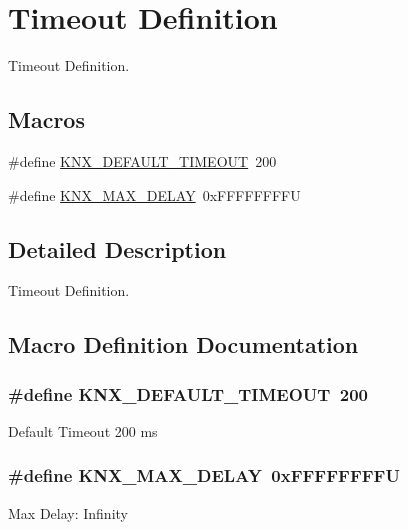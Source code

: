 \hypertarget{group___k_n_x___timeout}{}\section{Timeout Definition}
\label{group___k_n_x___timeout}


Timeout Definition.  


\subsection*{Macros}
\begin{DoxyCompactItemize}
\item 
\#define \hyperlink{group___k_n_x___timeout_ga2403c0399f3728bfe63f5d9cf631817d}{K\+N\+X\+\_\+\+D\+E\+F\+A\+U\+L\+T\+\_\+\+T\+I\+M\+E\+O\+UT}~200
\item 
\#define \hyperlink{group___k_n_x___timeout_ga8e1f26f2f54559b80991272e3b5e13e8}{K\+N\+X\+\_\+\+M\+A\+X\+\_\+\+D\+E\+L\+AY}~0x\+F\+F\+F\+F\+F\+F\+F\+FU
\end{DoxyCompactItemize}


\subsection{Detailed Description}
Timeout Definition. 



\subsection{Macro Definition Documentation}
\subsubsection[{\texorpdfstring{K\+N\+X\+\_\+\+D\+E\+F\+A\+U\+L\+T\+\_\+\+T\+I\+M\+E\+O\+UT}{KNX_DEFAULT_TIMEOUT}}]{\setlength{\rightskip}{0pt plus 5cm}\#define K\+N\+X\+\_\+\+D\+E\+F\+A\+U\+L\+T\+\_\+\+T\+I\+M\+E\+O\+UT~200}\hypertarget{group___k_n_x___timeout_ga2403c0399f3728bfe63f5d9cf631817d}{}\label{group___k_n_x___timeout_ga2403c0399f3728bfe63f5d9cf631817d}
Default Timeout 200 ms 
\subsubsection[{\texorpdfstring{K\+N\+X\+\_\+\+M\+A\+X\+\_\+\+D\+E\+L\+AY}{KNX_MAX_DELAY}}]{\setlength{\rightskip}{0pt plus 5cm}\#define K\+N\+X\+\_\+\+M\+A\+X\+\_\+\+D\+E\+L\+AY~0x\+F\+F\+F\+F\+F\+F\+F\+FU}\hypertarget{group___k_n_x___timeout_ga8e1f26f2f54559b80991272e3b5e13e8}{}\label{group___k_n_x___timeout_ga8e1f26f2f54559b80991272e3b5e13e8}
Max Delay\+: Infinity 